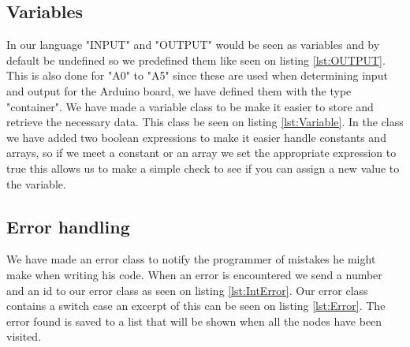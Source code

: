 \subsection*{Variables}
In our language "INPUT" and "OUTPUT" would be seen as variables and by default be undefined so we predefined them like seen on listing \ref{lst:OUTPUT}. This is also done for "A0" to "A5" since these are used when determining input and output for the Arduino board, we have defined them with the type "container".
We have made a variable class to be make it easier to store and retrieve the necessary data. This class be seen on listing \ref{lst:Variable}. In the class we have added two boolean expressions to make it easier handle constants and arrays, so if we meet a constant or an array we set the appropriate expression to true this allows us to make a simple check to see if you can assign a new value to the variable.

\subsection*{Error handling}
We have made an error class to notify the programmer of mistakes he might make when writing his code. When an error is encountered we send a number and an id to our error class as seen on listing \ref{lst:IntError}.
Our error class contains a switch case an excerpt of this can be seen on listing \ref{lst:Error}. The error found is saved to a list that will be shown when all the nodes have been visited.
